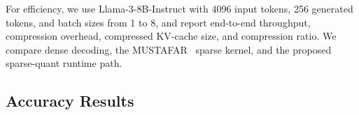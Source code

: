 \documentclass[runningheads]{llncs}
\newcommand{\multifieldqa}{Multi\-FieldQA-EN}
\begin{document}
For efficiency, we use Llama-3-8B-Instruct with 4096 input tokens, 256 generated tokens, and batch sizes from 1 to 8, and report end-to-end throughput, compression overhead, compressed KV-cache size, and compression ratio. We compare dense decoding, the MUSTAFAR~\cite{joo2025mustafar} sparse kernel, and the proposed sparse-quant runtime path.


\subsection{Accuracy Results}
\end{document}
